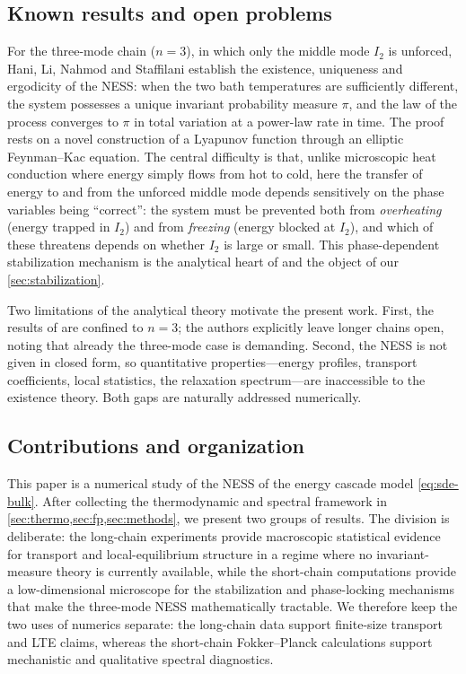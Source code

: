 \documentclass[11pt,a4paper]{article}
\theoremstyle{definition}
\numberwithin{equation}{section}   %
\begin{document}
\subsection{Known results and open problems}\label{sec:known}

For the three-mode chain ($n=3$), in which only the middle mode $I_2$ is
unforced, Hani, Li, Nahmod and Staffilani \cite{HLNS} establish the existence,
uniqueness and ergodicity of the NESS: when the two bath temperatures are
sufficiently different, the system possesses a unique invariant probability
measure $\pi$, and the law of the process converges to $\pi$ in total variation
at a power-law rate in time. The proof rests on a novel construction of a
Lyapunov function through an elliptic Feynman--Kac equation. The central
difficulty is that, unlike microscopic heat conduction where energy simply flows
from hot to cold, here the transfer of energy to and from the unforced middle
mode depends sensitively on the phase variables being ``correct'': the system
must be prevented both from \emph{overheating} (energy trapped in $I_2$) and from
\emph{freezing} (energy blocked at $I_2$), and which of these threatens depends on
whether $I_2$ is large or small. This phase-dependent stabilization mechanism is
the analytical heart of \cite{HLNS} and the object of our \cref{sec:stabilization}.

Two limitations of the analytical theory motivate the present work. First, the
results of \cite{HLNS} are confined to $n=3$; the authors explicitly leave longer
chains open, noting that already the three-mode case is demanding. Second, the
NESS is not given in closed form, so quantitative properties---energy profiles,
transport coefficients, local statistics, the relaxation spectrum---are
inaccessible to the existence theory. Both gaps are naturally addressed
numerically.

\subsection{Contributions and organization}\label{sec:contributions}

This paper is a numerical study of the NESS of the energy cascade model
\eqref{eq:sde-bulk}. After collecting the thermodynamic and spectral framework in
\cref{sec:thermo,sec:fp,sec:methods}, we present two groups of results.
The division is deliberate: the long-chain experiments provide macroscopic
statistical evidence for transport and local-equilibrium structure in a regime
where no invariant-measure theory is currently available, while the short-chain
computations provide a low-dimensional microscope for the stabilization and
phase-locking mechanisms that make the three-mode NESS mathematically
tractable. We therefore keep the two uses of numerics separate: the long-chain
data support finite-size transport and LTE claims, whereas the short-chain
Fokker--Planck calculations support mechanistic and qualitative spectral
diagnostics.
\end{document}
